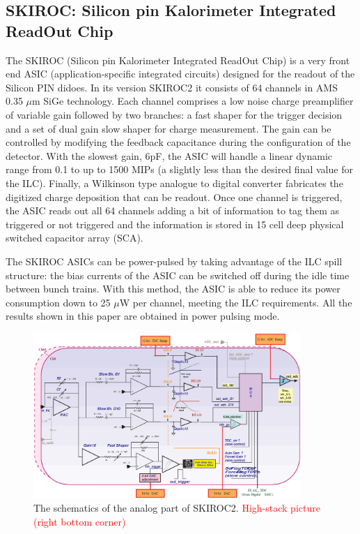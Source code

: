 \documentclass[a4paper,11pt]{article}
\newcommand{\todo}[1]{\textcolor{red}{{#1}}}
\begin{document}

\subsection{SKIROC: Silicon pin Kalorimeter Integrated ReadOut Chip}
\label{sec:skiroc}

The SKIROC\cite{Callier:2011zz} (Silicon pin Kalorimeter Integrated ReadOut Chip) is a
very front end ASIC (application-specific integrated circuits)
designed for the readout of the Silicon PIN didoes.
In its version SKIROC2 it consists of 64 channels in AMS 0.35 $\mu$m SiGe technology.
Each channel comprises a low noise charge preamplifier of variable gain followed by two branches:
a fast shaper for the trigger decision and a set of dual gain slow shaper for charge measurement. 
The gain can be controlled by modifying the feedback capacitance during the configuration of the detector.
With the slowest gain, 6pF, the ASIC will handle a linear dynamic range from 0.1 to up to 1500 MIPs 
(a slightly less than the desired final value for the ILC). 
Finally, a Wilkinson type analogue to digital converter fabricates the digitized charge deposition that can be readout. 
Once one channel is triggered, the ASIC reads out all 64 channels adding a bit of information to tag them as
triggered or not triggered and the information is stored in 15 cell deep physical switched capacitor array (SCA).

The SKIROC ASICs can be power-pulsed by taking advantage of the ILC spill structure: 
the bias currents of the ASIC can be switched off during the idle time between bunch trains.
With this method, the ASIC is able to reduce its power consumption down to 25 $\mu$W per channel,
meeting the ILC requirements. All the results shown in this paper are obtained in power pulsing mode.

\begin{figure}[!t]
  \centering
    \includegraphics[width=4in]{figs/skiroc2_block.eps}
\caption{The schematics of the analog part of SKIROC2. \todo{High-stack picture (right bottom corner)}}
\label{SKIROC2}
\end{figure}
\end{document}

